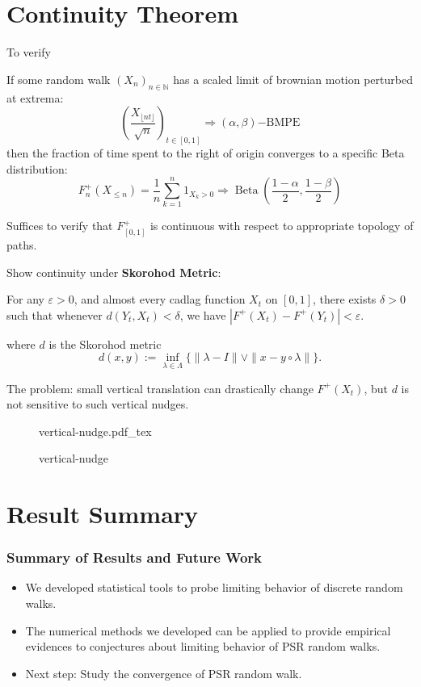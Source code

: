 \documentclass{beamer}
\newcommand{\incfig}[1]{%


    \def\svgwidth{\columnwidth}
    {#1.pdf_tex}
}
\begin{document}
\section{Continuity Theorem}

\begin{frame}
	To verify
\begin{theorem}
		If some random walk $(X_n)_{n \in \mathbb{N}}$ has a scaled limit of brownian motion perturbed at extrema:
\[
\left(\frac{X_{\lfloor n t\rfloor}}{\sqrt{n}}\right)_{t \in[0,1]} \Rightarrow(\alpha, \beta)\mathrm{-BMPE}
\]
then the fraction of time spent to the right of origin converges to a specific Beta distribution:
\[
F^+_n(X_{\le n}) = \frac{1}{n} \sum_{k=1}^n 1_{X_k>0} \Rightarrow \operatorname{Beta}\left(\frac{1-\alpha}{2}, \frac{1-\beta}{2}\right)
\]
	\end{theorem}
	\pause
	Suffices to verify that $F^+_{[0,1]}$ is continuous with respect to appropriate topology of paths.
\end{frame}

\begin{frame}
	Show continuity under \textbf{Skorohod Metric}:
	\begin{lemma}
		For any $\varepsilon>0$, and almost every cadlag function $X_t$ on $[0,1]$, there exists $\delta>0$ such that whenever $d(Y_t, X_t) < \delta$, we have $|F^+(X_t) - F^+(Y_t)|< \varepsilon$.

		where $d$ is the Skorohod metric
		 \[
			d(x,y) := \inf _{\lambda \in \Lambda}\{\|\lambda-I\| \vee\|x-y \circ \lambda\|\}
		.\] 
	\end{lemma}
	\pause

	The problem: small vertical translation can drastically change $F^+(X_t)$, but $d$ is not sensitive to such vertical nudges. 
\begin{figure}[ht]
    \centering
    \incfig{vertical-nudge}
    \caption{vertical-nudge}
    \label{fig:vertical-nudge}
\end{figure}
	
\end{frame}




\section{Result Summary}


\begin{frame}
	\frametitle{Summary of Results and Future Work}
	\begin{itemize}
		\item We developed statistical tools to probe limiting behavior of discrete random walks.
		\item<2-> The numerical methods we developed can be applied to provide empirical evidences to conjectures about limiting behavior of PSR random walks.
		\item<3-> Next step: Study the convergence of PSR random walk.
	\end{itemize}
\end{frame}



\begin{frame}
    \printbibliography
\end{frame}
\end{document}

